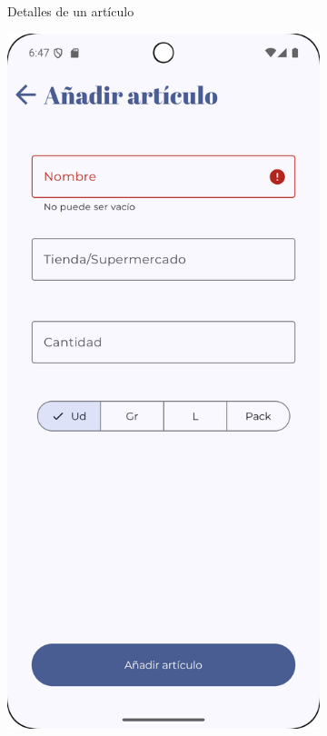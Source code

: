 \begin{figure}[H]
\begin{subfigure}[b]{0.3\textwidth}
      \caption{Detalles de un artículo}
      \label{fig:item-details}
    \end{subfigure}
    \hfill
    \begin{subfigure}[b]{0.3\textwidth}
      \includegraphics[width=\textwidth]{./img/manual/add_item_empty_name.png}

\end{subfigure}
\end{figure}
